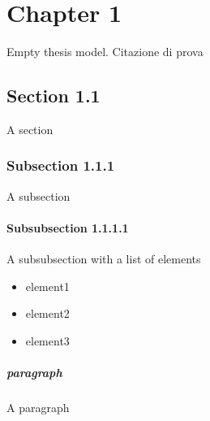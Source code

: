 \chapter{Chapter 1}
Empty thesis model. Citazione di prova \cite{latexcompanion}
\section{Section 1.1}
A section
\subsection{Subsection 1.1.1}
A subsection
\subsubsection{Subsubsection 1.1.1.1}
A subsubsection with a list of elements
\begin{itemize}
	\item element1
	\item element2
	\item element3
\end{itemize}
\paragraph{paragraph} A paragraph